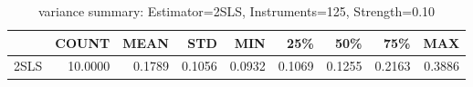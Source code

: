 \begin{table}[ht]
\centering
\caption{variance summary: Estimator=2SLS, Instruments=125, Strength=0.10}
\begin{tabular}{lrrrrrrrr}
\toprule
 & COUNT & MEAN & STD & MIN & 25\% & 50\% & 75\% & MAX \\
\midrule
2SLS & 10.0000 & 0.1789 & 0.1056 & 0.0932 & 0.1069 & 0.1255 & 0.2163 & 0.3886 \\
\bottomrule
\end{tabular}
\end{table}
